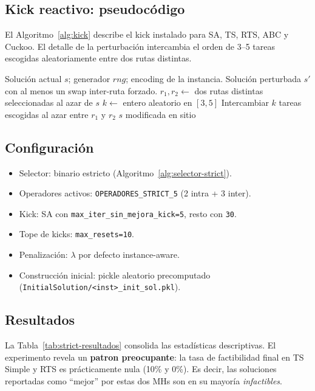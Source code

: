 \documentclass[11pt,a4paper]{article}
\theoremstyle{definition}
\theoremstyle{remark}
\begin{document}
\subsection{Kick reactivo: pseudocódigo}

El Algoritmo~\ref{alg:kick} describe el kick instalado para SA, TS,
RTS, ABC y Cuckoo. El detalle de la perturbación intercambia el orden
de 3--5 tareas escogidas aleatoriamente entre dos rutas distintas.

\begin{algorithm}[h]
\caption{Kick reactivo poblacional.}
\label{alg:kick}
\begin{algorithmic}[1]
\Require Solución actual $s$; generador $rng$; encoding de la instancia.
\Ensure Solución perturbada $s'$ con al menos un swap inter-ruta forzado.
\State $r_1, r_2 \gets$ dos rutas distintas seleccionadas al azar de $s$
\State $k \gets$ entero aleatorio en $[3, 5]$
\State Intercambiar $k$ tareas escogidas al azar entre $r_1$ y $r_2$
\State \Return $s$ modificada en sitio
\end{algorithmic}
\end{algorithm}

\subsection{Configuración}

\begin{itemize}
\item Selector: binario estricto (Algoritmo~\ref{alg:selector-strict}).
\item Operadores activos: \texttt{OPERADORES\_STRICT\_5}
  (2 intra + 3 inter).
\item Kick: SA con \texttt{max\_iter\_sin\_mejora\_kick=5},
  resto con \texttt{30}.
\item Tope de kicks: \texttt{max\_resets=10}.
\item Penalización: $\lambda$ por defecto instance-aware.
\item Construcción inicial: pickle aleatorio precomputado
  (\texttt{InitialSolution/<inst>\_init\_sol.pkl}).
\end{itemize}

\subsection{Resultados}

La Tabla~\ref{tab:strict-resultados} consolida las estadísticas
descriptivas. El experimento revela un \textbf{patron preocupante}: la
tasa de factibilidad final en TS Simple y RTS es prácticamente nula
(10\% y 0\%). Es decir, las soluciones reportadas como ``mejor'' por
estas dos MHs son en su mayoría \emph{infactibles}.
\end{document}
